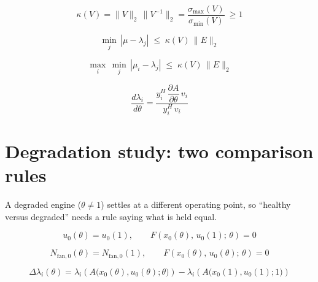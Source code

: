 \documentclass[11pt,a4paper]{article}
\begin{document}
\begin{equation}
  \kappa(V) = \|V\|_2\,\|V^{-1}\|_2 = \frac{\sigma_{\max}(V)}{\sigma_{\min}(V)} \ \ge 1
  \label{eq:kappa}
\end{equation}

\begin{equation}
  \min_{j}\,\left| \mu - \lambda_j \right| \;\le\; \kappa(V)\,\|E\|_2
  \label{eq:bauer-fike}
\end{equation}

\begin{equation}
  \max_{i}\,\min_{j}\,\left| \mu_i - \lambda_j \right| \;\le\; \kappa(V)\,\|E\|_2
  \label{eq:eig-shift}
\end{equation}

\begin{equation}
  \frac{d\lambda_i}{d\theta} =
  \frac{y_i^{H}\,\dfrac{\partial A}{\partial \theta}\,v_i}{y_i^{H}\,v_i}
  \label{eq:eig-sensitivity}
\end{equation}

\section{Degradation study: two comparison rules}
A degraded engine ($\theta \neq 1$) settles at a different operating point, so
``healthy versus degraded'' needs a rule saying what is held equal.

\begin{equation}
  u_0(\theta) = u_0(1), \qquad F\!\left(x_0(\theta),\,u_0(1);\,\theta\right) = 0
  \label{eq:rule-same-fuel}
\end{equation}

\begin{equation}
  N_{\mathrm{fan},0}(\theta) = N_{\mathrm{fan},0}(1), \qquad
  F\!\left(x_0(\theta),\,u_0(\theta);\,\theta\right) = 0
  \label{eq:rule-same-fan-speed}
\end{equation}

\begin{equation}
  \Delta\lambda_i(\theta) = \lambda_i\!\left(A\big(x_0(\theta),u_0(\theta);\theta\big)\right)
                          - \lambda_i\!\left(A\big(x_0(1),u_0(1);1\big)\right)
  \label{eq:delta-lambda}
\end{equation}
\end{document}
